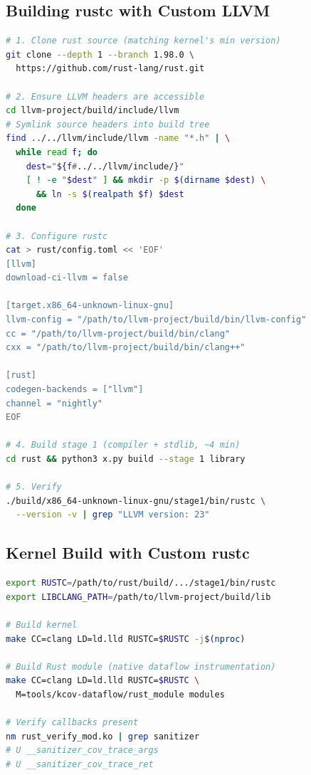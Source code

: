 \documentclass{ndss}
\begin{document}
\subsection{Building rustc with Custom LLVM}

\begin{lstlisting}[language=bash,caption={Complete rustc build procedure.}]
# 1. Clone rust source (matching kernel's min version)
git clone --depth 1 --branch 1.98.0 \
  https://github.com/rust-lang/rust.git

# 2. Ensure LLVM headers are accessible
cd llvm-project/build/include/llvm
# Symlink source headers into build tree
find ../../llvm/include/llvm -name "*.h" | \
  while read f; do
    dest="${f#../../llvm/include/}"
    [ ! -e "$dest" ] && mkdir -p $(dirname $dest) \
      && ln -s $(realpath $f) $dest
  done

# 3. Configure rustc
cat > rust/config.toml << 'EOF'
[llvm]
download-ci-llvm = false

[target.x86_64-unknown-linux-gnu]
llvm-config = "/path/to/llvm-project/build/bin/llvm-config"
cc = "/path/to/llvm-project/build/bin/clang"
cxx = "/path/to/llvm-project/build/bin/clang++"

[rust]
codegen-backends = ["llvm"]
channel = "nightly"
EOF

# 4. Build stage 1 (compiler + stdlib, ~4 min)
cd rust && python3 x.py build --stage 1 library

# 5. Verify
./build/x86_64-unknown-linux-gnu/stage1/bin/rustc \
  --version -v | grep "LLVM version: 23"
\end{lstlisting}

\subsection{Kernel Build with Custom rustc}

\begin{lstlisting}[language=bash,caption={Building kernel with native Rust dataflow support.}]
export RUSTC=/path/to/rust/build/.../stage1/bin/rustc
export LIBCLANG_PATH=/path/to/llvm-project/build/lib

# Build kernel
make CC=clang LD=ld.lld RUSTC=$RUSTC -j$(nproc)

# Build Rust module (native dataflow instrumentation)
make CC=clang LD=ld.lld RUSTC=$RUSTC \
  M=tools/kcov-dataflow/rust_module modules

# Verify callbacks present
nm rust_verify_mod.ko | grep sanitizer
# U __sanitizer_cov_trace_args
# U __sanitizer_cov_trace_ret
\end{lstlisting}
\end{document}
